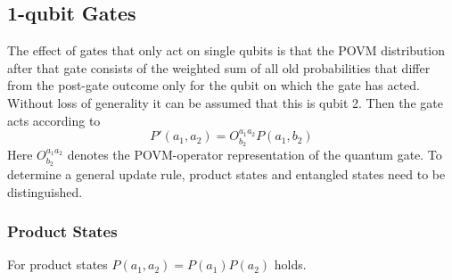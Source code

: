 \documentclass[a4]{article}
\begin{document}
\subsection{1-qubit Gates}
The effect of gates that only act on single qubits is that the POVM distribution
after that gate consists of the weighted sum of all old probabilities that
differ from the post-gate outcome only for the qubit on which the gate has
acted. Without loss of generality it can be assumed that this is qubit 2. Then
the gate acts according to
\begin{equation}
    P'(a_1,a_2) = O^{a_1a_2}_{b_2} P(a_1, b_2)
\end{equation}
Here $O^{a_1a_2}_{b_2}$ denotes the POVM-operator representation of the quantum
gate. To determine a general update rule, product states and entangled states
need to be distinguished.
\subsubsection{Product States}
For product states $P(a_1,a_2)=P(a_1)P(a_2)$ holds.
\end{document}
